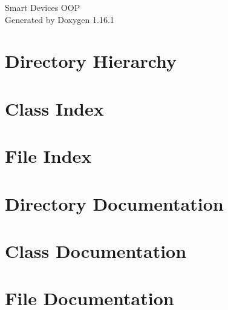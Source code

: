 \documentclass[twoside]{book}
\newcommand{\+}{\discretionary{\mbox{\scriptsize$\hookleftarrow$}}{}{}}
\newcommand{\clearemptydoublepage}{%
    \newpage{\pagestyle{empty}\cleardoublepage}%
  }
\begin{document}
  \raggedbottom
    \hypersetup{pageanchor=false,
                bookmarksnumbered=true,
                pdfencoding=unicode
               }
  \begin{titlepage}
  \vspace*{7cm}
  \begin{center}%
  {\Large Smart Devices OOP}\\
  \vspace*{1cm}
  {\large Generated by Doxygen 1.16.1}\\
  \end{center}
  \end{titlepage}
  \clearemptydoublepage
  \tableofcontents
  \clearemptydoublepage
  \hypersetup{pageanchor=true}
\chapter{Directory Hierarchy}

\chapter{Class Index}

\chapter{File Index}

\chapter{Directory Documentation}



\chapter{Class Documentation}

\chapter{File Documentation}









  \backmatter
  \newpage
  \clearemptydoublepage
  \printindex
\end{document}
